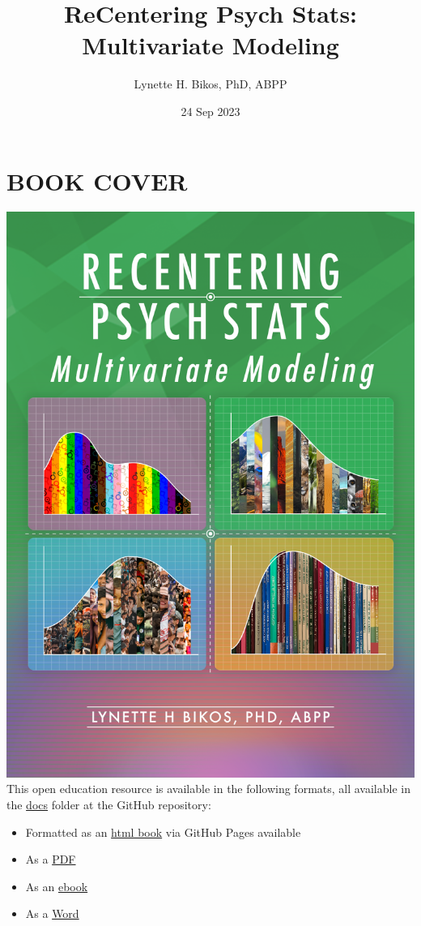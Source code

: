 \documentclass[
  11pt,
]{book}
\title{ReCentering Psych Stats: Multivariate Modeling}
\author{Lynette H. Bikos, PhD, ABPP}
\date{24 Sep 2023}
\providecommand{\tightlist}{%
  \setlength{\itemsep}{0pt}\setlength{\parskip}{0pt}}
\begin{document}
\maketitle

{
\hypersetup{linkcolor=}
\setcounter{tocdepth}{3}
\tableofcontents
}
\hypertarget{book-cover}{%
\chapter*{BOOK COVER}\label{book-cover}}


\includegraphics{images/ReC_multivariate_bkcvr.png} This open education resource is available in the following formats, all available in the \href{https://github.com/lhbikos/ReC_MultivModel/tree/main/docs}{docs} folder at the GitHub repository:

\begin{itemize}
\tightlist
\item
  Formatted as an \href{https://lhbikos.github.io/ReC_MultivModel/}{html book} via GitHub Pages available
\item
  As a \href{https://github.com/lhbikos/ReC_MultivModel/blob/main/docs/ReC_MultMod.pdf}{PDF}
\item
  As an \href{https://github.com/lhbikos/ReC_MultivModel/blob/main/docs/ReC_MultMod.epub}{ebook}
\item
  As a \href{https://github.com/lhbikos/ReC_MultivModel/blob/main/docs/ReC_MultMod.docx}{Word}
\end{itemize}
\end{document}
